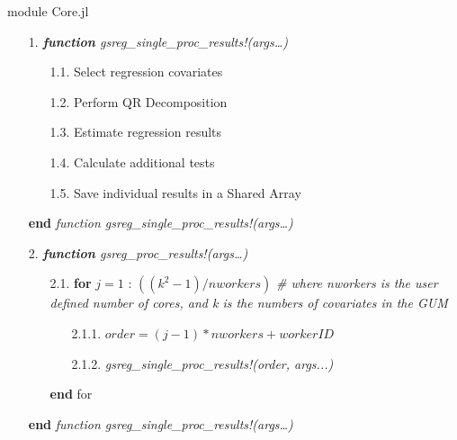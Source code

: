 \documentclass{juliacon}
\begin{document}
\begin{algorithm}[ht]
  \scriptsize
  \caption{module Core.jl}
  \begin{enumerate}
    
    \item[1.] \textit{\textbf{function} gsreg\_single\_proc\_results!(args…)}
    \begin{enumerate}
        \item[1.1.] Select regression covariates
        \item[1.2.] Perform QR Decomposition
        \item[1.3.] Estimate regression results
        \item[1.4.] Calculate additional tests
        \item[1.5.] Save individual results in a Shared Array
    \end{enumerate}
    \item[] \textbf{end} \textit{function gsreg\_single\_proc\_results!(args…)}

\vspace{2mm}
    
    \item[2.] \textit{\textbf{function} gsreg\_proc\_results!(args…)}
    \begin{enumerate}
        \item[2.1.] \textbf{for} $j=1$ : $((k^2-1)/ nworkers)$ \textit{\# where nworkers is the user defined number of cores, and k is the numbers of covariates in the GUM}
        \begin{enumerate}
            \item[2.1.1.] $order = (j -1) * nworkers + workerID$
            \item[2.1.2.] \textit{gsreg\_single\_proc\_results!(order, args...)}
        \end{enumerate}
        \item[] \textbf{end} for
    \end{enumerate}
    \item[] \textbf{end} \textit{function gsreg\_single\_proc\_results!(args…)}
    
\vspace{2mm}


\end{enumerate}
\end{algorithm}
\end{document}
